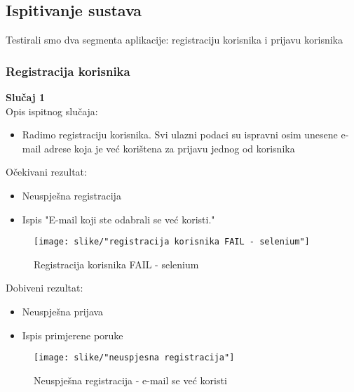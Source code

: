 			\subsection{Ispitivanje sustava}
			
			 Testirali smo dva segmenta aplikacije: registraciju korisnika i prijavu korisnika
			 		
			 	\subsubsection{Registracija korisnika}	
			 		\textbf{Slučaj 1}\\
			 		Opis ispitnog slučaja:
			 		\begin{itemize}
			 			\item Radimo registraciju korisnika. Svi ulazni podaci su ispravni osim unesene e-mail adrese koja je već korištena za prijavu jednog od korisnika
			 		\end{itemize}
		 			Očekivani rezultat:
		 			\begin{itemize}
		 				\setlength\itemsep{0.1em}
		 				\item Neuspješna registracija
		 				\item Ispis "E-mail koji ste odabrali se već koristi."
		 			\end{itemize}
	 				\begin{figure}[H]
	 					\texttt{[image: slike/"registracija korisnika FAIL - selenium"]}
	 					\centering
	 					\caption{Registracija korisnika FAIL - selenium}
	 					\label{registracija korisnika FAIL - selenium}
	 				\end{figure}
 					Dobiveni rezultat:
 					\begin{itemize}
 						\setlength\itemsep{0.1em}
 						\item Neuspješna prijava
 						\item Ispis primjerene poruke
 					\end{itemize}
 					\begin{figure}[H]
 						\texttt{[image: slike/"neuspjesna registracija"]}
 						\centering
 						\caption{Neuspješna registracija - e-mail se već koristi}
 						\label{neuspjesna registracija - e-mail se vec koristi}
 					\end{figure}
 					
